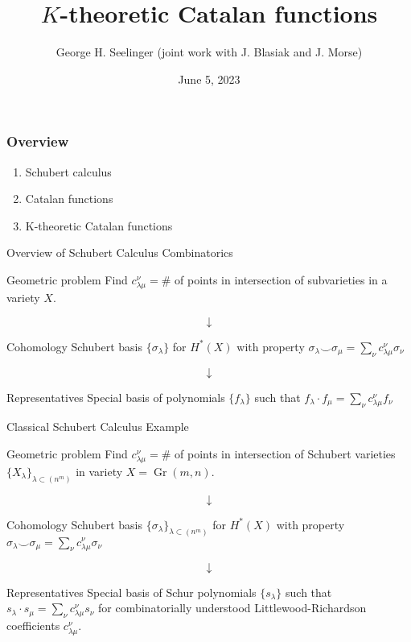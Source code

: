 \documentclass{beamer}
\title[\(K\)-theoretic Catalan functions]{\(K\)-theoretic Catalan functions} %
\author[George H. Seelinger]{George H. Seelinger (joint work with
  J. Blasiak and J. Morse)} %
\institute[UMich] %
{
CMS Summer 2023 Meeting\\ %
\medskip
ghseeli@umich.edu\\ %
}
\date{June 5, 2023} %
\DeclareMathOperator{\Gr}{Gr}
\newcommand{\cupprod}{\smile}
\theoremstyle{definition}
\begin{document}
\begin{frame}
\titlepage %
\end{frame}
\begin{frame}
  \frametitle{Overview}
  \begin{enumerate}
  \item Schubert calculus
  \item Catalan functions
  \item K-theoretic Catalan functions
  \end{enumerate}
\end{frame}
\begin{frame}{Overview of Schubert Calculus Combinatorics}
  \begin{block}{Geometric problem}
    Find \(c_{\lambda \mu}^\nu = \#\) of points in
    intersection of subvarieties in a variety \(X\). \pause
  \end{block}
  \[
    \downarrow
  \]
  \begin{block}{Cohomology}
    Schubert basis \(\{\sigma_\lambda\}\) for \(H^*(X)\) with property
    \(\sigma_\lambda \cupprod \sigma_\mu = \sum_\nu c_{\lambda \mu}^\nu \sigma_\nu\) \pause 
\end{block}
\[
  \downarrow
\]
\begin{block}{Representatives}
  Special basis of polynomials \(\{f_\lambda\}\) such that \(f_\lambda \cdot f_\mu = \sum_\nu c_{\lambda \mu}^\nu f_\nu\)
\end{block}
\end{frame}
\begin{frame}{Classical Schubert Calculus Example}
    \begin{block}{Geometric problem}
    Find \(c_{\lambda \mu}^\nu = \#\) of points in
    intersection of Schubert varieties \(\{X_\lambda\}_{\lambda
      \subset (n^m)}\) in variety \(X = \Gr(m,n)\). \pause
  \end{block}
  \vspace{-0.1in}
  \[
    \downarrow
  \]
  \vspace{-0.1in}
  \begin{block}{Cohomology}
    Schubert basis \(\{\sigma_\lambda\}_{\lambda \subset (n^m)}\) for
    \(H^*(X)\) with property \(\sigma_\lambda \cupprod \sigma_\mu = \sum_\nu c_{\lambda \mu}^\nu \sigma_\nu\) %
  \end{block}\pause
\vspace{-0.1in}  
\[
  \downarrow
\]
\vspace{-0.1in}
\begin{block}{Representatives}
  Special basis of Schur polynomials \(\{s_\lambda\}\) such that
  \(s_\lambda \cdot s_\mu = \sum_\nu c_{\lambda \mu}^\nu s_\nu\) for
  combinatorially understood Littlewood-Richardson coefficients \(c_{\lambda \mu}^\nu\).
\end{block}
\end{frame}
\end{document}
